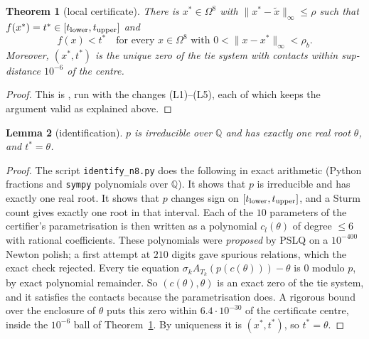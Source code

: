 \documentclass[11pt]{amsart}
\newtheorem{theorem}{Theorem}[section]
\newtheorem{lemma}[theorem]{Lemma}
\theoremstyle{definition}
\newcommand{\Q}{\mathbb{Q}}
\newcommand{\tstar}{t^{*}}
\newcommand{\Om}{\Omega}
\begin{document}
\begin{theorem}[local certificate]\label{thm:local}
There is $x^* \in \Om^8$ with $\|x^* - \tilde x\|_\infty \le \rho$ such that $f(x^*) = \tstar \in [t_{\rm lower}, t_{\rm upper}]$ and
\[
  f(x) < \tstar \quad\text{for every } x \in \Om^8 \text{ with } 0 < \|x - x^*\|_\infty < \rho_b .
\]
Moreover, $(x^*, \tstar)$ is the unique zero of the tie system with contacts within sup-distance $10^{-6}$ of the centre.
\end{theorem}
\begin{proof}
This is \cite[Theorem~2.1 and Theorem~B.4]{N9}, run with the changes (L1)--(L5), each of which keeps the argument valid as explained above.
\end{proof}

\begin{lemma}[identification]\label{lem:ident}
$p$ is irreducible over $\Q$ and has exactly one real root $\theta$, and $\tstar = \theta$.
\end{lemma}
\begin{proof}
The script \texttt{identify\_n8.py} does the following in exact arithmetic (Python fractions and \texttt{sympy} polynomials over $\Q$). It shows that $p$ is irreducible and has exactly one real root. It shows that $p$ changes sign on $[t_{\rm lower}, t_{\rm upper}]$, and a Sturm count gives exactly one root in that interval. Each of the $10$ parameters of the certifier's parametrisation is then written as a polynomial $c_l(\theta)$ of degree $\le 6$ with rational coefficients. These polynomials were \emph{proposed} by PSLQ on a $10^{-400}$ Newton polish; a first attempt at $210$ digits gave spurious relations, which the exact check rejected. Every tie equation $\sigma_k A_{T_k}(p(c(\theta))) - \theta$ is $0$ modulo $p$, by exact polynomial remainder. So $(c(\theta), \theta)$ is an exact zero of the tie system, and it satisfies the contacts because the parametrisation does. A rigorous bound over the enclosure of $\theta$ puts this zero within $6.4\cdot10^{-30}$ of the certificate centre, inside the $10^{-6}$ ball of Theorem~\ref{thm:local}. By uniqueness it is $(x^*, \tstar)$, so $\tstar = \theta$.
\end{proof}

\end{document}
